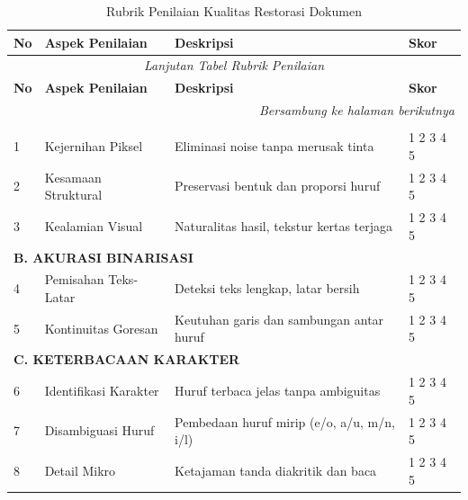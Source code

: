 \documentclass[12pt,a4paper]{article}
\begin{document}

\begin{longtable}{|p{0.5cm}|p{3.5cm}|p{7cm}|p{1.5cm}|}
\caption{Rubrik Penilaian Kualitas Restorasi Dokumen} \\
\hline
\textbf{No} & \textbf{Aspek Penilaian} & \textbf{Deskripsi} & \textbf{Skor} \\
\hline
\endfirsthead

\multicolumn{4}{c}{\textit{Lanjutan Tabel Rubrik Penilaian}} \\
\hline
\textbf{No} & \textbf{Aspek Penilaian} & \textbf{Deskripsi} & \textbf{Skor} \\
\hline
\endhead

\hline
\multicolumn{4}{r}{\textit{Bersambung ke halaman berikutnya}} \\
\endfoot

\hline
\endlastfoot


\multicolumn{4}{|l|}{\textbf{A. KUALITAS VISUAL}} \\
\hline
1 & Kejernihan Piksel & Eliminasi noise tanpa merusak tinta & 1 2 3 4 5 \\
\hline
2 & Kesamaan Struktural & Preservasi bentuk dan proporsi huruf & 1 2 3 4 5 \\
\hline
3 & Kealamian Visual & Naturalitas hasil, tekstur kertas terjaga & 1 2 3 4 5 \\
\hline

\multicolumn{4}{|l|}{\textbf{B. AKURASI BINARISASI}} \\
\hline
4 & Pemisahan Teks-Latar & Deteksi teks lengkap, latar bersih & 1 2 3 4 5 \\
\hline
5 & Kontinuitas Goresan & Keutuhan garis dan sambungan antar huruf & 1 2 3 4 5 \\
\hline

\multicolumn{4}{|l|}{\textbf{C. KETERBACAAN KARAKTER}} \\
\hline
6 & Identifikasi Karakter & Huruf terbaca jelas tanpa ambiguitas & 1 2 3 4 5 \\
\hline
7 & Disambiguasi Huruf & Pembedaan huruf mirip (e/o, a/u, m/n, i/l) & 1 2 3 4 5 \\
\hline
8 & Detail Mikro & Ketajaman tanda diakritik dan baca & 1 2 3 4 5 \\
\hline


\end{longtable}
\end{document}

